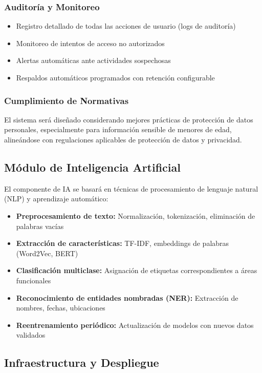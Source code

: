 \documentclass[12pt,letterpaper]{article}
\begin{document}
\subsubsection{Auditoría y Monitoreo}

\begin{itemize}
    \item Registro detallado de todas las acciones de usuario (logs de auditoría)
    \item Monitoreo de intentos de acceso no autorizados
    \item Alertas automáticas ante actividades sospechosas
    \item Respaldos automáticos programados con retención configurable
\end{itemize}

\subsubsection{Cumplimiento de Normativas}

El sistema será diseñado considerando mejores prácticas de protección de datos personales, especialmente para información sensible de menores de edad, alineándose con regulaciones aplicables de protección de datos y privacidad.

\subsection{Módulo de Inteligencia Artificial}

El componente de IA se basará en técnicas de procesamiento de lenguaje natural (NLP) y aprendizaje automático:

\begin{itemize}
    \item \textbf{Preprocesamiento de texto:} Normalización, tokenización, eliminación de palabras vacías
    \item \textbf{Extracción de características:} TF-IDF, embeddings de palabras (Word2Vec, BERT)
    \item \textbf{Clasificación multiclase:} Asignación de etiquetas correspondientes a áreas funcionales
    \item \textbf{Reconocimiento de entidades nombradas (NER):} Extracción de nombres, fechas, ubicaciones
    \item \textbf{Reentrenamiento periódico:} Actualización de modelos con nuevos datos validados
\end{itemize}

\subsection{Infraestructura y Despliegue}
\end{document}

